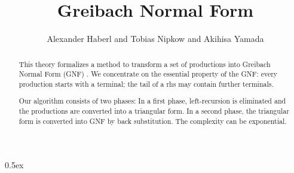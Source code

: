 \documentclass[11pt,a4paper]{article}
\begin{document}
\title{Greibach Normal Form}
\author{Alexander Haberl and Tobias Nipkow and Akihisa Yamada}
\maketitle

\begin{abstract}
This theory formalizes a method to transform a set of productions into 
Greibach Normal Form (GNF) \cite{Greibach}. We concentrate on the essential property of the GNF:
every production starts with a terminal; the tail of a rhs may contain further terminals.

Our algorithm consists of two phases: In a first phase, left-recursion is eliminated
and the productions are converted into a triangular form. In a second phase,
the triangular form is converted into GNF by back substitution.
The complexity can be exponential.
\end{abstract}

\parindent 0pt\parskip 0.5ex





\end{document}
